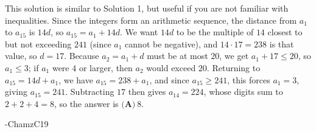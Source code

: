 \begin{enumerate}
This solution is similar to Solution 1, but useful if you are not familiar with inequalities. Since the integers form an arithmetic sequence, the distance from $a_1$ to $a_{15}$ is $14d$, so $a_{15} = a_1 + 14d$. We want $14d$ to be the multiple of $14$ closest to but not exceeding $241$ (since $a_1$ cannot be negative), and $14 \cdot 17 = 238$ is that value, so $d = 17$. Because $a_2 = a_1 + d$ must be at most $20$, we get $a_1 + 17 \le 20$, so $a_1 \le 3$; if $a_1$ were $4$ or larger, then $a_2$ would exceed $20$. Returning to $a_{15} = 14d + a_1$, we have $a_{15} = 238 + a_1$, and since $a_{15} \ge 241$, this forces $a_1 = 3$, giving $a_{15} = 241$. Subtracting $17$ then gives $a_{14} = 224$, whose digits sum to $2 + 2 + 4 = 8$, so the answer is $\boxed{\textbf{(A)}\ 8}$.

 -ChamzC19

 


\end{enumerate}